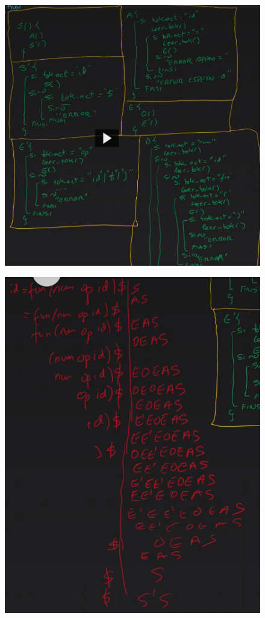 \documentclass[12pt, twoside, openright]{report} %
\begin{document}
\begin{figure}[H]
	{\includegraphics[scale=.5]{Untitled 102.png}}
\end{figure}

\begin{figure}[H]
	{\includegraphics[scale=.7]{2021-03-26 17_50_51-Ejercicio descendente recursivo.png}}
\end{figure}
\end{document}
